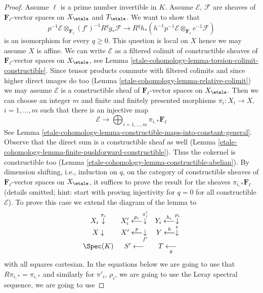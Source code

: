 \begin{proof}
\medskip\noindent
Assume $\ell$ is a prime number invertible in $K$.
Assume $\mathcal{E}$, $\mathcal{F}$ are sheaves of
$\mathbf{F}_\ell$-vector spaces on $X_\etale$ and $T_\etale$.
We want to show that
$$
p^{-1}\mathcal{E} \otimes_{\mathbf{F}_\ell} (f')^{-1}R^qg_*\mathcal{F}
\longrightarrow
R^qh_*(h^{-1}p^{-1}\mathcal{E} \otimes_{\mathbf{F}_\ell} e^{-1}\mathcal{F})
$$
is an isomorphism for every $q \geq 0$. This question is local on $X$
hence we may assume $X$ is affine. We can write $\mathcal{E}$
as a filtered colimit of constructible sheaves of
$\mathbf{F}_\ell$-vector spaces on $X_\etale$, see
Lemma \ref{etale-cohomology-lemma-torsion-colimit-constructible}.
Since tensor products commute
with filtered colimits and since
higher direct images do too (Lemma \ref{etale-cohomology-lemma-relative-colimit})
we may assume $\mathcal{E}$ is a constructible sheaf of
$\mathbf{F}_\ell$-vector spaces on $X_\etale$.
Then we can choose an integer $m$ and finite and finitely presented morphisms
$\pi_i : X_i \to X$, $i = 1, \ldots, m$
such that there is an injective map
$$
\mathcal{E} \to
\bigoplus\nolimits_{i = 1, \ldots, m}
\pi_{i, *}\mathbf{F}_\ell
$$
See Lemma \ref{etale-cohomology-lemma-constructible-maps-into-constant-general}.
Observe that the direct sum is a constructible sheaf as well
(Lemma \ref{etale-cohomology-lemma-finite-pushforward-constructible}).
Thus the cokernel is constructible too
(Lemma \ref{etale-cohomology-lemma-constructible-abelian}).
By dimension shifting, i.e., induction on $q$,
on the category of constructible sheaves of
$\mathbf{F}_\ell$-vector spaces on $X_\etale$, it suffices to prove the
result for the sheaves $\pi_{i, *}\mathbf{F}_\ell$
(details omitted; hint: start with proving injectivity for $q = 0$
for all constructible $\mathcal{E}$).
To prove this case we extend the diagram of the lemma to
$$
\begin{array}{ccc}X_i \overset{\pi_i}{\downarrow} & X'_i \overset{p_i}{\longleftarrow}\overset{\pi'_i}{\downarrow} & Y_i \overset{h_i}{\longleftarrow}\overset{\rho_i}{\downarrow} \\ X \downarrow & X' \overset{p}{\longleftarrow}\underset{f'}{\downarrow} & Y \overset{h}{\longleftarrow}\overset{e}{\downarrow} \\ \Spec(K) & S' \longleftarrow & T \underset{g}{\longleftarrow}\end{array}
$$
with all squares cartesian. In the equations below we are
going to use that $R\pi_{i, *} = \pi_{i, *}$ and similarly
for $\pi'_i$, $\rho_i$, we are going to use the Leray spectral sequence,
we are going to use

\end{proof}
